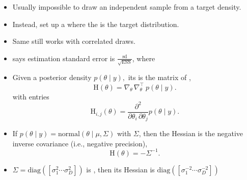 \documentclass[10pt]{report}
\begin{document}
\begin{itemize}
\item Usually impossible to draw an independent sample from a target density.
\item Instead, set up a  where the 
  is the target distribution.
\item Same  still works with correlated draws.
\item {} says estimation standard error is
  $\frac{\textrm{sd}}{\sqrt{\textrm{ESS}}}$, where
\end{itemize}



\begin{itemize}
\item Given a posterior density $p(\theta \mid y),$ its  is the
  matrix of ,
  $$
  \textrm{H}(\theta) = \nabla_{\!\!\theta} \, \nabla_{\!\!\theta}^\top \ p(\theta \mid y).
  $$
  with entries
  $$
  \textrm{H}_{i, j}(\theta) = \frac{\partial^2}{\partial \theta_i \, \partial
    \theta_j} p(\theta \mid y).
  $$
\item If $p(\theta \mid y) = \textrm{normal}(\theta \mid \mu, \Sigma)$ with
   $\Sigma$, then the Hessian is the
  negative inverse covariance (i.e., negative precision),
  $$
  \textrm{H}(\theta) = -\Sigma^{-1}.
  $$
\item 
  
  $\Sigma = \textrm{diag}([\sigma_1^2 \cdots \sigma_D^2])$ is
  , then its Hessian is $\textrm{diag}([\sigma_1^{-2} \cdots
  \sigma_D^{-2}])$
\end{itemize}
\end{document}
